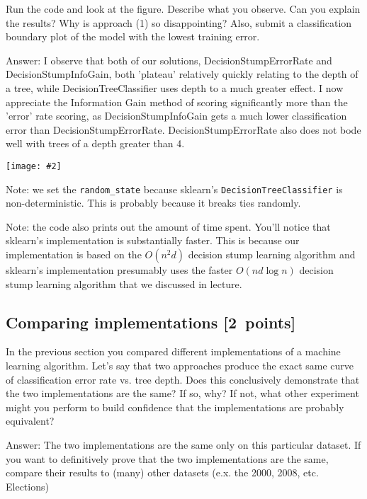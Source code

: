 \documentclass{article}
\newcommand{\blu}[1]{{\textcolor{blu}{#1}}}
\newenvironment{answer}{\par\begingroup\color{gre}Answer: }{\endgroup}
\let\ask\blu
\newcommand\pts[1]{\textcolor{pointscolour}{[#1~points]}}
\newcommand{\centerfig}[2]{\begin{center}\texttt{[image: \#2]}\end{center}}
\begin{document}
  Run the code and look at the figure.
  \ask{Describe what you observe. Can you explain the results?} Why is approach (1) so disappointing? Also, \ask{submit a classification boundary plot of the model with the lowest training error}.

  \begin{answer}
  I observe that both of our solutions, DecisionStumpErrorRate and DecisionStumpInfoGain, both 'plateau' relatively quickly relating to the depth of a tree, while DecisionTreeClassifier uses depth to a much greater effect. I now appreciate the Information Gain method of scoring significantly more than the 'error' rate scoring, as DecisionStumpInfoGain gets a much lower classification error than DecisionStumpErrorRate. DecisionStumpErrorRate also does not bode well with trees of a depth greater than 4.
  \centerfig{0.7}{./figs/q6_5_decisionBoundary}
  \end{answer}

  Note: we set the \verb|random_state| because sklearn's \texttt{DecisionTreeClassifier} is non-deterministic. This is probably
  because it breaks ties randomly.

  Note: the code also prints out the amount of time spent. You'll notice that sklearn's implementation is substantially faster. This is because
  our implementation is based on the $O(n^2d)$ decision stump learning algorithm and sklearn's implementation presumably uses the faster $O(nd\log n)$
  decision stump learning algorithm that we discussed in lecture.

  \subsection{Comparing implementations \pts{2}}

  In the previous section you compared different implementations of a machine learning algorithm. Let's say that two
  approaches produce the exact same curve of classification error rate vs. tree depth. Does this conclusively demonstrate
  that the two implementations are the same? If so, why? If not, what other experiment might you perform to build confidence
  that the implementations are probably equivalent?

  \begin{answer}
  The two implementations are the same only on this particular dataset. If you want to definitively prove that the two implementations are the same, compare their results to (many) other datasets (e.x. the 2000, 2008, etc. Elections)
  \end{answer}
\end{document}
